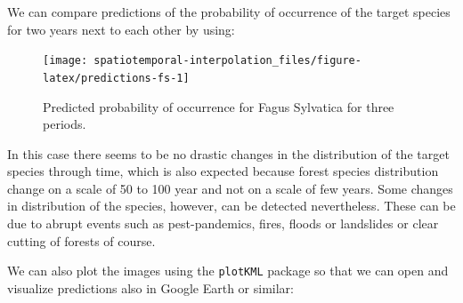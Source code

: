 \documentclass[
  graybox,natbib,nospthms]{svmono}
\newenvironment{Shaded}{\begin{snugshade}}{\end{snugshade}}
\newcommand{\AttributeTok}[1]{\textcolor[rgb]{0.61,0.61,0.61}{#1}}
\newcommand{\CommentTok}[1]{\textcolor[rgb]{0.37,0.37,0.37}{\textit{#1}}}
\newcommand{\DecValTok}[1]{\textcolor[rgb]{0.06,0.06,0.06}{#1}}
\newcommand{\FunctionTok}[1]{\textcolor[rgb]{0,0,0}{#1}}
\newcommand{\NormalTok}[1]{#1}
\newcommand{\OtherTok}[1]{\textcolor[rgb]{0.37,0.37,0.37}{#1}}
\newcommand{\SpecialCharTok}[1]{\textcolor[rgb]{0,0,0}{#1}}
\newcommand{\StringTok}[1]{\textcolor[rgb]{0.5,0.5,0.5}{#1}}
\begin{document}
We can compare predictions of the probability of occurrence of the
target species for two years next to each other by using:

\begin{Shaded}
\end{Shaded}

\begin{figure}

{\centering \texttt{[image: spatiotemporal-interpolation\_files/figure-latex/predictions-fs-1]} 

}

\caption{Predicted probability of occurrence for Fagus Sylvatica for three periods.}\label{fig:predictions-fs}
\end{figure}

In this case there seems to be no drastic changes in the distribution of
the target species through time, which is also expected because forest species distribution
change on a scale of 50 to 100 year and not on a scale of few years.
Some changes in distribution of the species, however, can be detected nevertheless.
These can be due to abrupt events such as pest-pandemics, fires, floods or landslides
or clear cutting of forests of course.

We can also plot the images using the \texttt{plotKML} package so that we can open and
visualize predictions also in Google Earth or similar:
\end{document}
